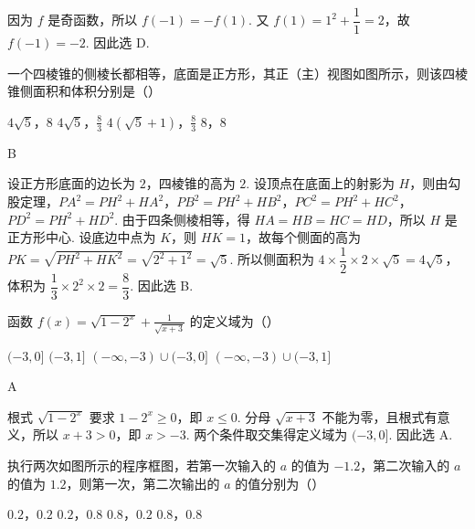 \begin{solution}
因为 \(f\) 是奇函数，所以 \(f(-1)=-f(1)\). 又 \(f(1)=1^2+\dfrac{1}{1}=2\)，故 \(f(-1)=-2\). 因此选 D.
\end{solution}

\begin{problem}
一个四棱锥的侧棱长都相等，底面是正方形，其正（主）视图如图所示，则该四棱锥侧面积和体积分别是（\quad）


\choices
    {\(4\sqrt{5}\)，\(8\)}
    {\(4\sqrt{5}\)，\(\frac{8}{3}\)}
    {\(4(\sqrt{5} + 1)\)，\(\frac{8}{3}\)}
    {\(8\)，\(8\)}
\end{problem}

\begin{answer}
B
\end{answer}

\begin{solution}
设正方形底面的边长为 \(2\)，四棱锥的高为 \(2\). 设顶点在底面上的射影为 \(H\)，则由勾股定理，\(PA^2=PH^2+HA^2\)，\(PB^2=PH^2+HB^2\)，\(PC^2=PH^2+HC^2\)，\(PD^2=PH^2+HD^2\). 由于四条侧棱相等，得 \(HA=HB=HC=HD\)，所以 \(H\) 是正方形中心. 设底边中点为 \(K\)，则 \(HK=1\)，故每个侧面的高为 \(PK=\sqrt{PH^2+HK^2}=\sqrt{2^2+1^2}=\sqrt{5}\). 所以侧面积为 \(4\times\dfrac{1}{2}\times2\times\sqrt{5}=4\sqrt{5}\)，体积为 \(\dfrac{1}{3}\times2^2\times2=\dfrac{8}{3}\). 因此选 B.
\end{solution}

\begin{problem}
函数 \( f(x) = \sqrt{1 - 2^x} + \frac{1}{\sqrt{x + 3}} \) 的定义域为（\quad）

\choices
    {\((-3,0]\)}
    {\((-3, 1]\)}
    {\((-\infty, -3) \cup (-3, 0]\)}
    {\((-\infty, -3) \cup (-3, 1]\)}
\end{problem}

\begin{answer}
A
\end{answer}

\begin{solution}
根式 \(\sqrt{1-2^x}\) 要求 \(1-2^x\geqslant0\)，即 \(x\leqslant0\). 分母 \(\sqrt{x+3}\) 不能为零，且根式有意义，所以 \(x+3>0\)，即 \(x>-3\). 两个条件取交集得定义域为 \((-3,0]\). 因此选 A.
\end{solution}

\begin{problem}
执行两次如图所示的程序框图，若第一次输入的 \(a\) 的值为 \(-1.2\)，第二次输入的 \(a\) 的值为 \(1.2\)，则第一次，第二次输出的 \(a\) 的值分别为（\quad）


\choices
    {\(0.2\)，\(0.2\)}
    {\(0.2\)，\(0.8\)}
    {\(0.8\)，\(0.2\)}
    {\(0.8\)，\(0.8\)}
\end{problem}

